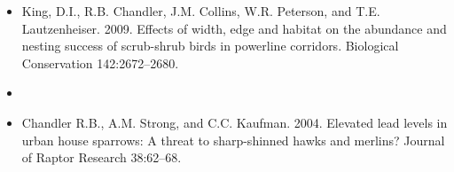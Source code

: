 \begin{itemize}
\item King, D.I., R.B. Chandler, J.M. Collins, W.R. Peterson, and
  T.E. Lautzenheiser. 2009. Effects of width, edge and habitat on the
  abundance and nesting success of scrub-shrub birds in powerline
  corridors. Biological Conservation 142:2672--2680.

\item[] { \\}

\item Chandler R.B., A.M. Strong, and C.C. Kaufman. 2004. Elevated
  lead levels in urban house sparrows: A threat to sharp-shinned hawks
  and merlins? Journal of Raptor Research 38:62--68.

\end{itemize}








\begin{comment}
\emph{Technical Reports}
\begin{itemize}
  \item Chandler, R.B., D.I. King, and C.C. Chandler. 2006. Butterfly
    occurrence and species richness in wildlife openings and clearcuts
    on the White Mountain National Forest. A Report to the Wildlife TES
    Program, White Mountain National Forest.
\end{itemize}
\end{comment}


